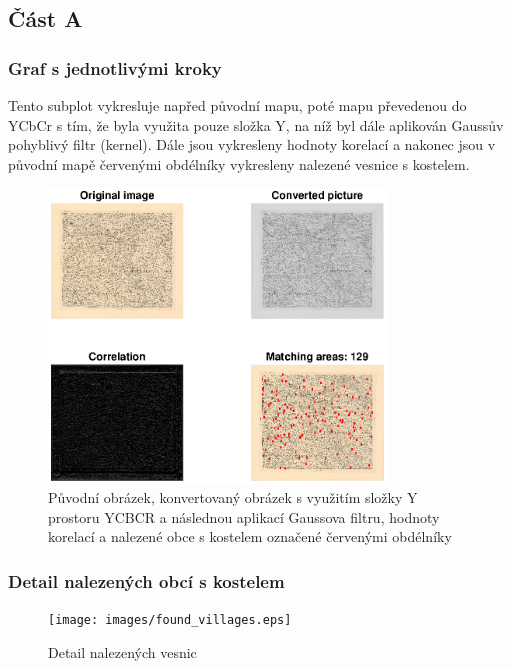 \subsection*{Část A}

\subsubsection*{Graf s jednotlivými kroky}
Tento subplot vykresluje napřed původní mapu, poté mapu převedenou do YCbCr s tím, že byla využita pouze složka Y, na níž byl dále aplikován Gaussův pohyblivý filtr (kernel). Dále jsou vykresleny hodnoty korelací a nakonec jsou v původní mapě červenými obdélníky vykresleny nalezené vesnice s kostelem.

\begin{figure}[H]
    \centering
    \includegraphics[width=0.8\textwidth]{images/plots.eps}
    \caption{Původní obrázek, konvertovaný obrázek s využitím složky Y prostoru YCBCR a následnou aplikací Gaussova filtru, hodnoty korelací a nalezené obce s kostelem označené červenými obdélníky}
\end{figure}

\subsubsection*{Detail nalezených obcí s kostelem}
\begin{figure}[H]
    \centering
    \texttt{[image: images/found\_villages.eps]}
    \caption{Detail nalezených vesnic}
\end{figure}


